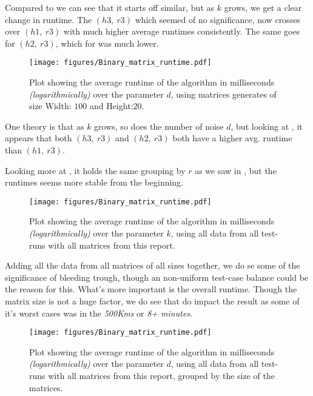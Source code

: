 \documentclass[a4paper]{article}
\begin{document}
Compared to  we can see that it starts off similar, but as $k$ grows, we get a
clear change in runtime. The $(h3,~r3)$ which seemed of no significance, now crosses over $(h1,~r3)$
with much higher average runtimes consistently. The same goes for $(h2,~r3)$, which for 
was much lower.

\begin{figure}[H]
    \centering
    \texttt{[image: figures/Binary\_matrix\_runtime.pdf]}
    \caption{Plot showing the average runtime of the algorithm in milliseconds \textit{(logarithmically)}
        over the parameter $d$, using matrices generates of size Width: $100$ and Height:$20$.}
    \label{fig:res-100x20d}
\end{figure}

One theory is that as $k$ grows, so does the number of noise $d$, but looking at
, it appears that both $(h3,~r3)$ and $(h2,~r3)$ both have a higher avg.
runtime than $(h1,~r3)$.

Looking more at , it holds the same grouping by $r$ as we saw in ,
but the runtimes seems more stable from the beginning.

\begin{figure}[H]
    \centering
    \texttt{[image: figures/Binary\_matrix\_runtime.pdf]}
    \caption{Plot showing the average runtime of the algorithm in milliseconds \textit{(logarithmically)}
        over the parameter $k$, using all data from all test-runs with all matrices from this report.}
    \label{fig:res-all-data}
\end{figure}

Adding all the data from all matrices of all sizes together, we do se some of the significance of 
bleeding trough, though an non-uniform test-case balance could be the reason for this. What's more important is the
overall runtime. Though the matrix size is not a huge factor, we do see that  do impact
the result as some of it's worst cases was in the \textit{500Kms} or \textit{8+ minutes}.

\begin{figure}[H]
    \centering
    \texttt{[image: figures/Binary\_matrix\_runtime.pdf]}
    \caption{Plot showing the average runtime of the algorithm in milliseconds \textit{(logarithmically)}
        over the parameter $d$, using all data from all test-runs with all matrices from this report, grouped by
        the size of the matrices.}
    \label{fig:res-all-matrices-over-d}
\end{figure}
\end{document}
